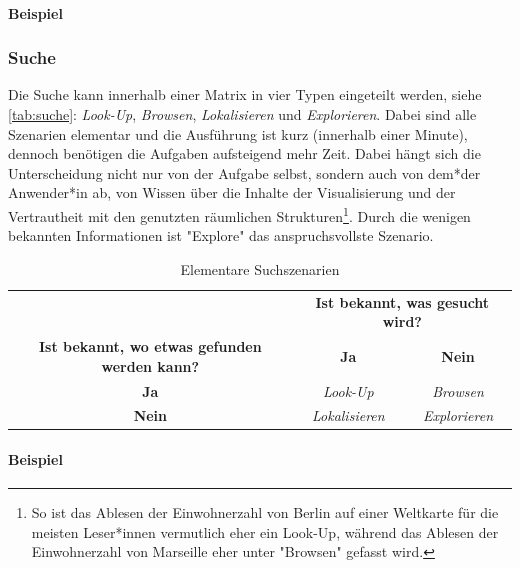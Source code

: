 			\paragraph{Beispiel}

			\subsubsection{Suche}
				Die Suche kann innerhalb einer Matrix in vier Typen eingeteilt werden, siehe \autoref{tab:suche}: \emph{Look-Up}, \emph{Browsen}, \emph{Lokalisieren} und \emph{Explorieren}. Dabei sind alle Szenarien elementar und die Ausführung ist kurz (innerhalb einer Minute), dennoch benötigen die Aufgaben aufsteigend mehr Zeit. Dabei hängt sich die Unterscheidung nicht nur von der Aufgabe selbst, sondern auch von dem*der Anwender*in ab, \dh von Wissen über die Inhalte der Visualisierung und der Vertrautheit mit den genutzten räumlichen Strukturen\footnote{So ist das Ablesen der Einwohnerzahl von Berlin auf einer Weltkarte für die meisten Leser*innen vermutlich eher ein Look-Up, während das Ablesen der Einwohnerzahl von Marseille eher unter "Browsen" gefasst wird.}. Durch die wenigen bekannten Informationen ist "Explore" das anspruchsvollste Szenario.

				\begin{table}
					\centering
					\begin{tabular}{c|cc}
						\toprule
						                                                     & \multicolumn{2}{c}{\textbf{Ist bekannt, was gesucht wird?}} \\
						\textbf{Ist bekannt, wo etwas gefunden werden kann?} &     \textbf{Ja}     &             \textbf{Nein}             \\ \midrule
						                    \textbf{Ja}                      &   \emph{Look-Up}    &            \emph{Browsen}             \\
						                   \textbf{Nein}                     & \emph{Lokalisieren} &          \emph{Explorieren}           \\ \bottomrule
					\end{tabular}
					\caption{Elementare Suchszenarien}
					\label{tab:suche}
				\end{table}

				\paragraph{Beispiel}

